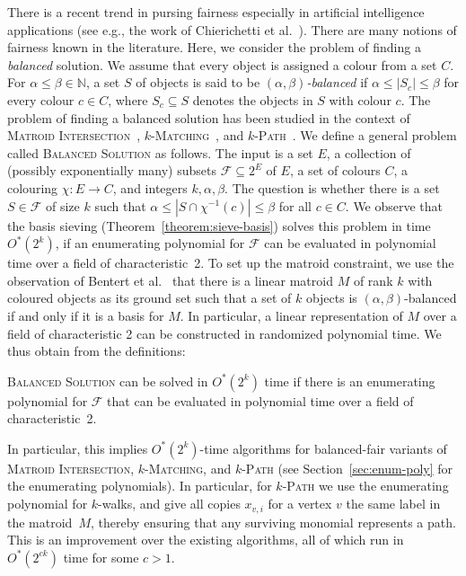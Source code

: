 \documentclass{theoretics}
\newcommand{\N}{\ensuremath{\mathbb N}\xspace}
\newcommand{\cF}{\ensuremath{\mathcal F}\xspace}
\begin{document}
There is a recent trend in pursing fairness especially in artificial intelligence applications (see e.g., the work of Chierichetti et al.~\cite{Chierichetti0LV17}).
There are many notions of fairness known in the literature.
Here, we consider the problem of finding a \emph{balanced} solution.
We assume that every object is assigned a colour from a set $C$.
For $\alpha \le \beta \in \N$, a set $S$ of objects is said to be \emph{$(\alpha, \beta)$-balanced} if $\alpha \le |S_c| \le \beta$ for every colour $c \in C$, where $S_c \subseteq S$ denotes the objects in $S$ with colour $c$.
The problem of finding a balanced solution has been studied in the context of \textsc{Matroid Intersection}~\cite{Chierichetti0LV19}, \textsc{$k$-Matching}~\cite{BandyapadhyayFIS23}, and \textsc{$k$-Path}~\cite{BentertKN23}.
We define a general problem called \textsc{Balanced Solution} as follows.
The input is a set $E$, a collection of (possibly exponentially many) subsets $\cF \subseteq 2^E$ of $E$, a set of colours $C$, a colouring $\chi \colon E \to C$, and integers $k, \alpha, \beta$.
The question is whether there is a set $S \in \cF$ of size $k$ such that $\alpha \le |S \cap \chi^{-1}(c)| \le \beta$ for all $c \in C$.
We observe that the basis sieving (Theorem~\ref{theorem:sieve-basis}) solves this problem in time $O^*(2^k)$, if an enumerating polynomial for $\mathcal{F}$ can be evaluated in polynomial time over a field of characteristic~2.
To set up the matroid constraint, we use the observation of Bentert et al.~\cite{BentertKN23} that there is a linear matroid $M$ of rank $k$ with coloured objects as its ground set such that a set of $k$ objects is $(\alpha, \beta)$-balanced if and only if it is a basis for $M$.
In particular, a linear representation of $M$ over a field of characteristic 2 can be constructed in randomized polynomial time.
We thus obtain from the definitions:

\begin{theorem}
  \textsc{Balanced Solution} can be solved in $O^*(2^k)$ time if there is an enumerating polynomial for $\cF$ that can be evaluated in polynomial time over a field of characteristic~2.
\end{theorem}

In particular, this implies $O^*(2^k)$-time algorithms for balanced-fair variants of \textsc{Matroid Intersection}, \textsc{$k$-Matching}, and \textsc{$k$-Path} (see Section~\ref{sec:enum-poly} for the enumerating polynomials).
In particular, for \textsc{$k$-Path} we use the enumerating polynomial for $k$-walks, and give all copies $x_{v,i}$ for a vertex $v$ the same label in the matroid~$M$,
thereby ensuring that any surviving monomial represents a path.
This is an improvement over the existing algorithms, all of which run in $O^*(2^{ck})$ time for some $c > 1$.
\end{document}
